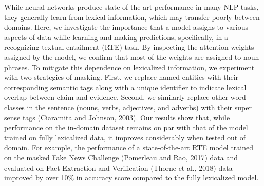 While neural networks produce state-of-the-art performance in many NLP tasks, they generally learn from lexical information, which may transfer poorly between domains. Here, we investigate the importance that a model assigns to various aspects of data while learning and making predictions, specifically, in a recognizing textual entailment (RTE) task. By inspecting the attention weights assigned by the model, we confirm that most of the weights are assigned to noun phrases. To mitigate this dependence on lexicalized information, we experiment with two strategies of masking. First, we replace named entities with their corresponding semantic tags along with a unique identifier to indicate lexical overlap between claim and evidence. Second, we similarly replace other word classes in the sentence (nouns, verbs, adjectives, and adverbs) with their super sense tags (Ciaramita and Johnson, 2003). Our results show that, while performance on the in-domain dataset remains on par with that of the model trained on fully lexicalized data, it improves considerably when tested out of domain. For example, the performance of a state-of-the-art RTE model trained on the masked Fake News Challenge (Pomerleau and Rao, 2017) data and evaluated on Fact Extraction and Verification (Thorne et al., 2018) data improved by over 10\% in accuracy score compared to the fully lexicalized model.